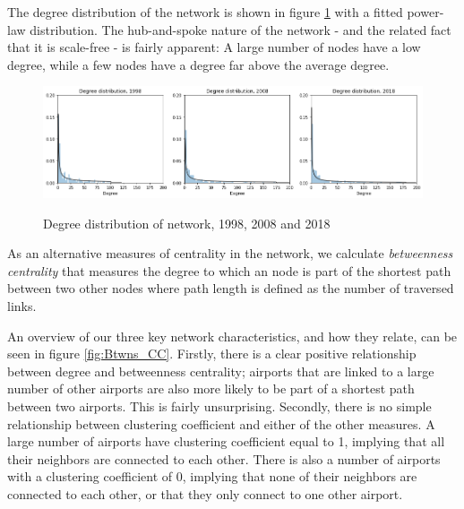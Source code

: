 \noindent
The degree distribution of the network is shown in figure \ref{fig:degree_distribution} with a fitted power-law distribution. The hub-and-spoke nature of the network - and the related fact that it is scale-free - is fairly apparent: A large number of nodes have a low degree, while a few nodes have a degree far above the average degree. 
\begin{figure}[H]
  \centering
  \caption{Degree distribution of network, 1998, 2008 and 2018}
    \includegraphics[width=1 \textwidth]{Exam/Figures/degree_distributionv2.png}
  \label{fig:degree_distribution}
\end{figure}
\noindent
As an alternative measures of centrality in the network, we calculate \textit{betweenness centrality} that measures the degree to which an node is part of the shortest path between two other nodes where path length is defined as the number of traversed links.
\par
An overview of our three key network characteristics, and how they relate, can be seen in figure \ref{fig:Btwns_CC}. Firstly, there is a clear positive relationship between degree and betweenness centrality; airports that are linked to a large number of other airports are also more likely to be part of a shortest path between two airports. This is fairly unsurprising. Secondly, there is no simple relationship between clustering coefficient and either of the other measures. A large number of airports have clustering coefficient equal to 1, implying that all their neighbors are connected to each other. There is also a number of airports with a clustering coefficient of 0, implying that none of their neighbors are connected to each other, or that they only connect to one other airport. 
